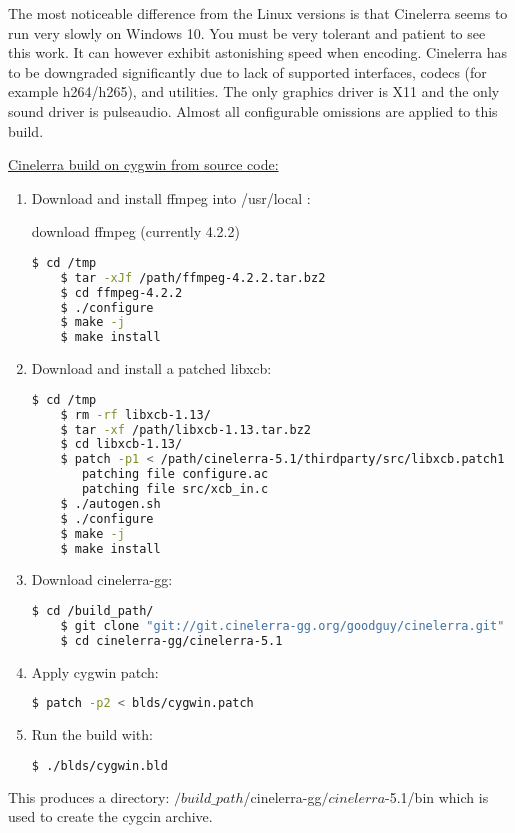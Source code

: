 The most noticeable difference from the Linux versions is that Cinelerra seems to run 
very slowly on Windows 10. You must be very tolerant and patient to see this work.  
It can however exhibit astonishing speed when encoding.  Cinelerra has to be downgraded significantly due to lack of supported interfaces, codecs (for example h264/h265), and utilities.  
The only graphics driver is X11 and the only sound driver is pulseaudio.  Almost all configurable
omissions are applied to this build.  

\underline{Cinelerra build on cygwin from source code:}

\begin{enumerate}
	\item Download and install ffmpeg into /usr/local :

   	download ffmpeg (currently 4.2.2)
\begin{lstlisting}[language=bash,numbers=none]
	$ cd /tmp
	$ tar -xJf /path/ffmpeg-4.2.2.tar.bz2
	$ cd ffmpeg-4.2.2
	$ ./configure
	$ make -j
	$ make install
\end{lstlisting}
	\item Download and install a patched libxcb:
\begin{lstlisting}[language=bash,numbers=none]
	$ cd /tmp
	$ rm -rf libxcb-1.13/
	$ tar -xf /path/libxcb-1.13.tar.bz2
	$ cd libxcb-1.13/
	$ patch -p1 < /path/cinelerra-5.1/thirdparty/src/libxcb.patch1
	   patching file configure.ac
	   patching file src/xcb_in.c
	$ ./autogen.sh
	$ ./configure
	$ make -j
	$ make install
\end{lstlisting}
	\item Download cinelerra-gg:
\begin{lstlisting}[language=bash,numbers=none]
	$ cd /build_path/
	$ git clone "git://git.cinelerra-gg.org/goodguy/cinelerra.git"
	$ cd cinelerra-gg/cinelerra-5.1
\end{lstlisting}
	\item Apply cygwin patch:
\begin{lstlisting}[language=bash,numbers=none]
	$ patch -p2 < blds/cygwin.patch
\end{lstlisting}
	\item Run the build with:
\begin{lstlisting}[language=bash,numbers=none]
	$ ./blds/cygwin.bld
\end{lstlisting}
\end{enumerate}

This produces a directory: $/build\_path$/cinelerra-gg$/cinelerra$-5.1/bin \newline
which is used to create the cygcin archive.

